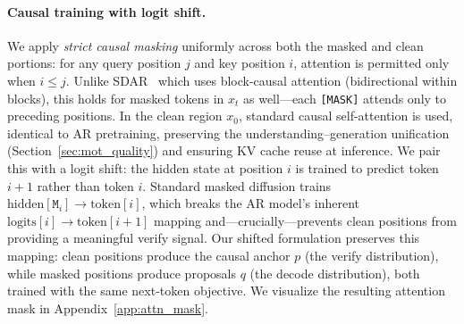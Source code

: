\paragraph{Causal training with logit shift.}
We apply \emph{strict causal masking} uniformly across both the masked and clean portions: for any query position $j$ and key position $i$, attention is permitted only when $i \leq j$. Unlike SDAR~\citep{sdar2025} which uses block-causal attention (bidirectional within blocks), this holds for masked tokens in $x_t$ as well---each \texttt{[MASK]} attends only to preceding positions. In the clean region $x_0$, standard causal self-attention is used, identical to AR pretraining, preserving the understanding--generation unification (Section~\ref{sec:mot_quality}) and ensuring KV cache reuse at inference. We pair this with a logit shift: the hidden state at position $i$ is trained to predict token $i{+}1$ rather than token $i$. Standard masked diffusion trains $\text{hidden}[\texttt{M}_i] \to \text{token}[i]$, which breaks the AR model's inherent $\text{logits}[i] \to \text{token}[i{+}1]$ mapping and---crucially---prevents clean positions from providing a meaningful verify signal. Our shifted formulation preserves this mapping: clean positions produce the causal anchor $p$ (the verify distribution), while masked positions produce proposals $q$ (the decode distribution), both trained with the same next-token objective. We visualize the resulting attention mask in Appendix~\ref{app:attn_mask}.


